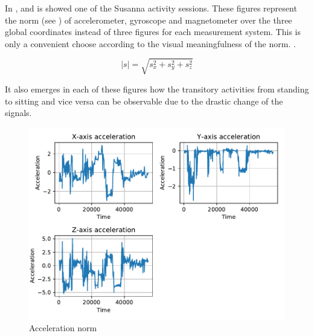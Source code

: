 In ,  and  is showed one of the Susanna activity sessions. These figures represent the norm (see ) of accelerometer, gyroscope and magnetometer over the three global coordinates instead of three figures for each measurement system. This is only a convenient choose according to the visual meaningfulness of the norm. 
.


\begin{equation}
|s| = \sqrt{s_x^2+s_y^2+s_z^2}
\label{eq:norm}
\end{equation}


It also emerges in each of these figures how the transitory activities from standing to sitting and vice versa can be observable due to the drastic change of the signals.

\begin{figure}[htp]
\includegraphics[scale=0.55]{acceleration_susanna.pdf}
\caption{Acceleration norm}
\label{fig:acc}
\end{figure}

